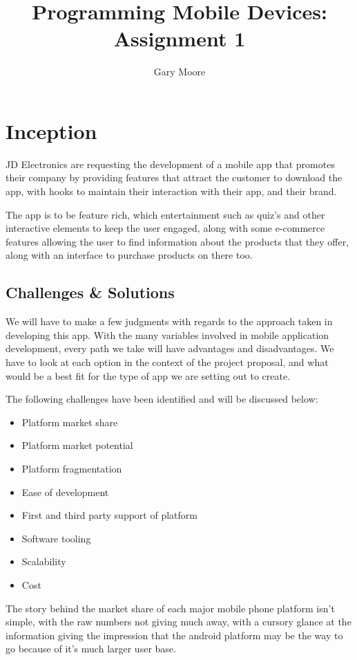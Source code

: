 \documentclass{scrreprt}
\title{Programming Mobile Devices: Assignment 1}
\author{Gary Moore}
\begin{document}
\maketitle
\tableofcontents

\chapter{Inception}\label{research}

JD Electronics are requesting the development of a mobile app that promotes their company by providing features that attract the customer to download the app, with hooks to maintain their interaction with their app, and their brand.

The app is to be feature rich, which entertainment such as quiz's and other  interactive elements to keep the user engaged, along with some e-commerce features allowing the user to find information about the products that they offer, along with an interface to purchase products on there too.

\section{Challenges \& Solutions}

We will have to make a few judgments with regards to the approach taken in developing this app. With the many variables involved in mobile application development, every path we take will have advantages and disadvantages. We have to look at each option in the context of the project proposal, and what would be a best fit for the type of app we are setting out to create.

The following challenges have been identified and will be discussed below:

\begin{itemize}
    \item Platform market share
    \item Platform market potential
    \item Platform fragmentation
    \item Ease of development
    \item First and third party support of platform
    \item Software tooling
    \item Scalability
    \item Cost
\end{itemize}

The story behind the market share of each major mobile phone platform isn't simple, with the raw numbers not giving much away, with a cursory glance at the information giving the impression that the android platform may be the way to go because of it's much larger user base.
\end{document}

